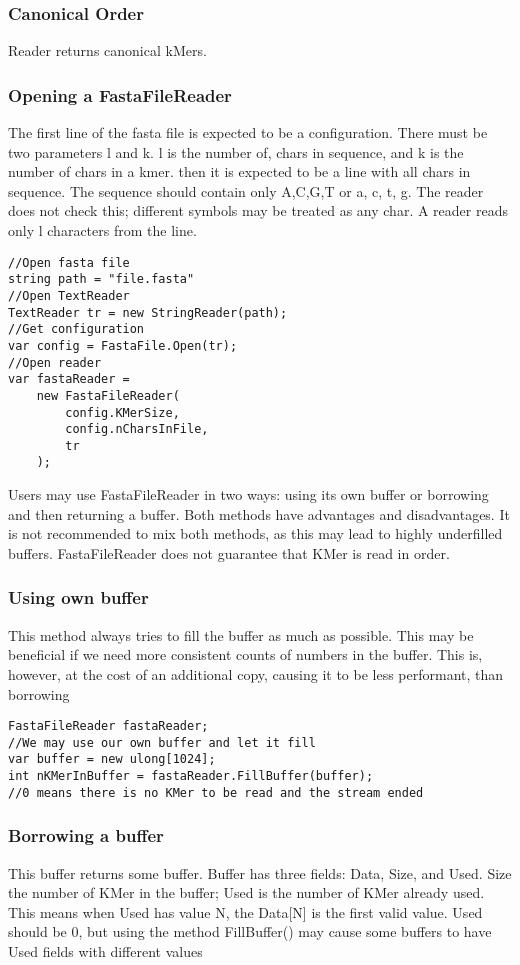 \subsubsection{Canonical Order}
Reader returns canonical kMers.

\subsubsection{Opening a FastaFileReader}
The first line of the fasta file is expected to be a configuration. There must be two parameters
l and k. l is the number of, chars in sequence, and k is the number of chars in a kmer.
then it is expected to be a line with all chars in sequence. The sequence should contain only A,C,G,T or a, c, t, g. The reader does not check this; different symbols may be treated as any char. A reader reads only l characters from the line.

\begin{lstlisting}
//Open fasta file
string path = "file.fasta"
//Open TextReader
TextReader tr = new StringReader(path);
//Get configuration
var config = FastaFile.Open(tr);
//Open reader
var fastaReader = 
    new FastaFileReader(
        config.KMerSize, 
        config.nCharsInFile, 
        tr
    );
\end{lstlisting}
Users may use FastaFileReader in two ways: using its own buffer or borrowing and then returning a buffer. Both methods have advantages and disadvantages. It is not recommended to mix both methods, as this may lead to highly underfilled buffers. FastaFileReader does not guarantee that KMer is read in order.
\subsubsection{Using own buffer}
This method always tries to fill the buffer as much as possible. This may be beneficial if we need more consistent counts of numbers in the buffer. This is, however, at the cost of an additional copy, causing it to be less performant, than borrowing
\begin{lstlisting}
FastaFileReader fastaReader;
//We may use our own buffer and let it fill
var buffer = new ulong[1024];
int nKMerInBuffer = fastaReader.FillBuffer(buffer);
//0 means there is no KMer to be read and the stream ended
\end{lstlisting}
\subsubsection{Borrowing a buffer}
This buffer returns some buffer. Buffer has three fields: Data, Size, and Used. Size the number of KMer in the buffer; Used is the number of KMer already used. This means when Used has value N, the Data[N] is the first valid value. Used should be 0, but using the method FillBuffer() may cause some buffers to have Used fields with different values

